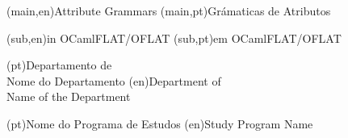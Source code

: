 
%


\nttitle(main,en){Attribute Grammars}%
\nttitle(main,pt){Grámaticas de Atributos}%

\nttitle(sub,en){in OCamlFLAT/OFLAT}%
\nttitle(sub,pt){em OCamlFLAT/OFLAT}%


\ntdepartment*(pt){Departamento de\\Nome do Departamento}
\ntdepartment*(en){Department of\\Name of the Department}

\ntdegreename*(pt){Nome do Programa de Estudos}
\ntdegreename*(en){Study Program Name}

